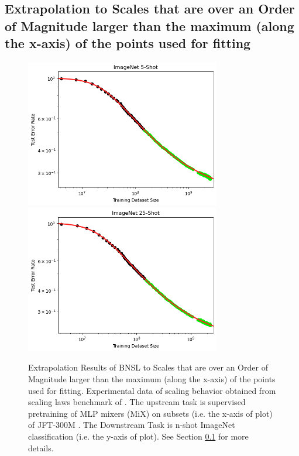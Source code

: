 \documentclass{article} %
\begin{document}
\FloatBarrier

\fi

\clearpage

\subsection{Extrapolation to Scales that are over an Order of Magnitude larger than the maximum (along the x-axis) of the points used for fitting}
\label{section:extrapolate_oom}

\begin{figure}[htbp]
    \centering
\includegraphics[width=0.76\textwidth]{figures/order_of_magnitude__data_x-axis/imagenet_5___MiX_L_16.png}
\includegraphics[width=0.76\textwidth]{figures/order_of_magnitude__data_x-axis/imagenet_25___MiX_L_16.png}

    \caption{
    Extrapolation Results of BNSL to Scales that are over an Order of Magnitude larger than the maximum (along the x-axis) of the points used for fitting. Experimental data of scaling behavior obtained from scaling laws benchmark of \cite{Alabdulmohsi2022revisiting}. The upstream task is supervised pretraining of MLP mixers (MiX) \citep{tolstikhin2021mlp} on subsets (i.e. the x-axis of plot) of JFT-300M \citep{sun2017revisiting}. The Downstream Task is n-shot ImageNet classification (i.e. the y-axis of plot). See Section \ref{section:extrapolate_oom} for more details.
    }
    \label{fig:extrapolate_oom}
\end{figure}
\end{document}
